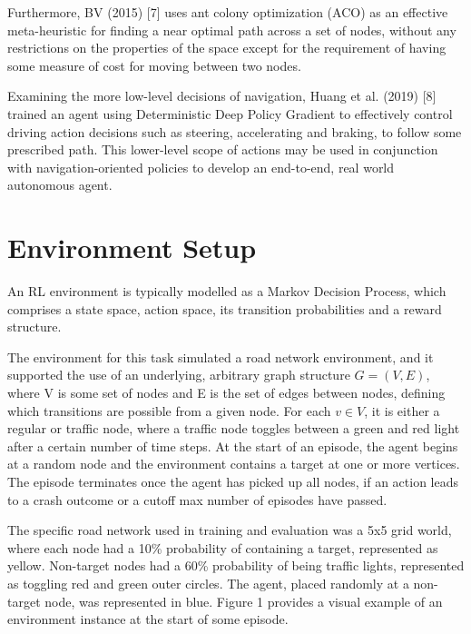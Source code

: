 \documentclass{article}
\begin{document}
	Furthermore, BV (2015) [7] uses ant colony optimization (ACO) as an effective meta-heuristic for finding a near optimal path across a set of nodes, without any restrictions on the properties of the space except for the requirement of having some measure of cost for moving between two nodes.
	
	Examining the more low-level decisions of navigation, Huang et al. (2019) [8] trained an agent using Deterministic Deep Policy Gradient to effectively control driving action decisions such as steering, accelerating and braking, to follow some prescribed path. This lower-level scope of actions may be used in conjunction with navigation-oriented policies to develop an end-to-end, real world autonomous agent. 
	
	\section{Environment Setup}
	An RL environment is typically modelled as a Markov Decision Process, which comprises a state space, action space, its transition probabilities and a reward structure.
	
	The environment for this task simulated a road network environment, and it supported the use of an underlying, arbitrary graph structure $G = (V, E)$, where V is some set of nodes and E is the set of edges between nodes, defining which transitions are possible from a given node. For each $v\in V$, it is either a regular or traffic node, where a traffic node toggles between a green and red light after a certain number of time steps. At the start of an episode, the agent begins at a random node and the environment contains a target at one or more vertices. The episode terminates once the agent has picked up all nodes, if an action leads to a crash outcome or a cutoff max number of episodes have passed.
	
	The specific road network used in training and evaluation was a 5x5 grid world, where each node had a 10\% probability of containing a target, represented as yellow. Non-target nodes had a 60\% probability of being traffic lights, represented as toggling red and green outer circles. The agent, placed randomly at a non-target node, was represented in blue. Figure 1 provides a visual example of an environment instance at the start of some episode. 
	
\end{document}
